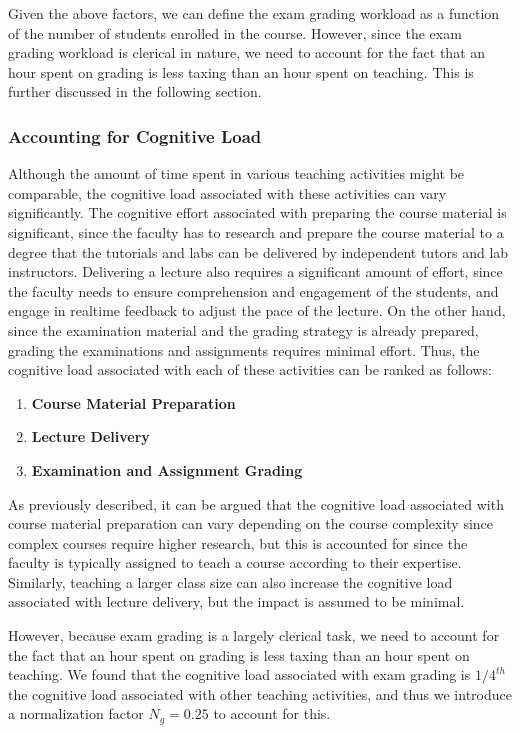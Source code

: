 Given the above factors, we can define the exam grading workload as a function of the number of students enrolled in the course. However, since the exam grading workload is clerical in nature, we need to account for the fact that an hour spent on grading is less taxing than an hour spent on teaching. This is further discussed in the following section.

\subsubsection{Accounting for Cognitive Load}
\label{sec:accounting_for_cognitive_load}

Although the amount of time spent in various teaching activities might be comparable, the cognitive load associated with these activities can vary significantly. The cognitive effort associated with preparing the course material is significant, since the faculty has to research and prepare the course material to a degree that the tutorials and labs can be delivered by independent tutors and lab instructors. Delivering a lecture also requires a significant amount of effort, since the faculty needs to ensure comprehension and engagement of the students, and engage in realtime feedback to adjust the pace of the lecture. On the other hand, since the examination material and the grading strategy is already prepared, grading the examinations and assignments requires minimal effort. Thus, the cognitive load associated with each of these activities can be ranked as follows:

\begin{enumerate}
  \item \textbf{Course Material Preparation}
  \item \textbf{Lecture Delivery}
  \item \textbf{Examination and Assignment Grading}
\end{enumerate}

As previously described, it can be argued that the cognitive load associated with course material preparation can vary depending on the course complexity since complex courses require higher research, but this is accounted for since the faculty is typically assigned to teach a course according to their expertise. Similarly, teaching a larger class size can also increase the cognitive load associated with lecture delivery, but the impact is assumed to be minimal.

However, because exam grading is a largely clerical task, we need to account for the fact that an hour spent on grading is less taxing than an hour spent on teaching. We found that the cognitive load associated with exam grading is \( 1/4^{th} \) the cognitive load associated with other teaching activities, and thus we introduce a normalization factor \(N_g = 0.25\) to account for this.

